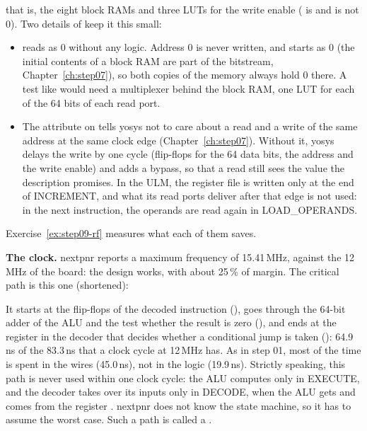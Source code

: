 that is, the eight block RAMs and three LUTs for the write enable
( is  and  is not 0). Two details of
 keep it this small:
\begin{itemize}
\item {} reads as 0 without any logic. Address 0 is never written, and
   starts as 0 (the initial contents of a block RAM are part of the
  bitstream, Chapter~\ref{ch:step07}), so both copies of the memory always
  hold 0 there. A test like  would need a
  multiplexer behind the block RAM, one LUT for each of the 64 bits of each
  read port.
\item The attribute  on  tells yosys not to
  care about a read and a write of the same address at the same clock edge
  (Chapter~\ref{ch:step07}). Without it, yosys delays the write by one cycle
  (flip-flops for the 64 data bits, the address and the write enable) and adds
  a bypass, so that a read still sees the value the description promises. In
  the ULM, the register file is written only at the end of INCREMENT, and
  what its read ports deliver after that edge is not used: in the next
  instruction, the operands are read again in LOAD\_OPERANDS.
\end{itemize}
Exercise~\ref{ex:step09-rf} measures what each of them saves.

\textbf{The clock.} nextpnr reports a maximum frequency of 15.41\,MHz,
against the 12\,MHz of the board: the design works, with about 25\,\% of
margin. The critical path is this one (shortened):


It starts at the flip-flops of the decoded instruction (),
goes through the 64-bit adder of the ALU and the test whether the result is
zero (), and ends at the register in the decoder that decides
whether a conditional jump is taken (): 64.9\,ns of the
83.3\,ns that a clock cycle at 12\,MHz has. As in step 01, most of the time is
spent in the wires (45.0\,ns), not in the logic (19.9\,ns). Strictly speaking,
this path is never used within one clock cycle: the ALU computes only in
EXECUTE, and the decoder takes over its inputs only in DECODE, when the ALU
gets  and  comes from the register . nextpnr
does not know the state machine, so it has to assume the worst case. Such a
path is called a .

